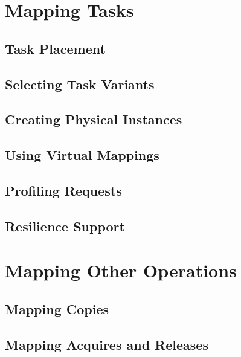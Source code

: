 \section{Mapping Tasks}
\label{sec:mapping:tasks}

\subsection{Task Placement}
\label{subsec:mapping:placement}

\subsection{Selecting Task Variants}
\label{subsec:mapping:variants}

\subsection{Creating Physical Instances}
\label{subsec:mapping:instances}

\subsection{Using Virtual Mappings}
\label{subsec:mapping:virtual}

\subsection{Profiling Requests}
\label{subsec:mapping:profiling}

\subsection{Resilience Support}
\label{subsec:mapping:resilience}



\section{Mapping Other Operations}
\label{sec:mapping:others}

\subsection{Mapping Copies}
\label{subsec:mapping:copies}

\subsection{Mapping Acquires and Releases}
\label{subsec:mapping:acquires}

